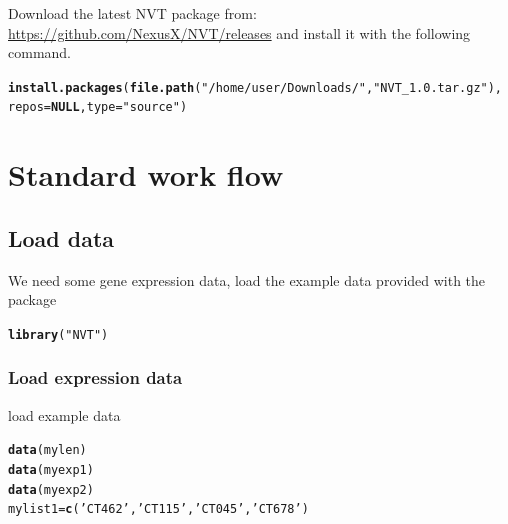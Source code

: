 \documentclass[11pt]{article}\usepackage[]{graphicx}\usepackage[]{color}
\makeatletter
\newcommand{\hlstr}[1]{\textcolor[rgb]{0.192,0.494,0.8}{#1}}%
\newcommand{\hlstd}[1]{\textcolor[rgb]{0.345,0.345,0.345}{#1}}%
\newcommand{\hlkwa}[1]{\textcolor[rgb]{0.161,0.373,0.58}{\textbf{#1}}}%
\newcommand{\hlkwb}[1]{\textcolor[rgb]{0.69,0.353,0.396}{#1}}%
\newcommand{\hlkwc}[1]{\textcolor[rgb]{0.333,0.667,0.333}{#1}}%
\newcommand{\hlkwd}[1]{\textcolor[rgb]{0.737,0.353,0.396}{\textbf{#1}}}%
\newenvironment{kframe}{%
 \def\at@end@of@kframe{}%
 \ifinner\ifhmode%
  \def\at@end@of@kframe{\end{minipage}}%
  \begin{minipage}{\columnwidth}%
 \fi\fi%
 \def\FrameCommand##1{\hskip\@totalleftmargin \hskip-\fboxsep
 \colorbox{shadecolor}{##1}\hskip-\fboxsep
     \hskip-\linewidth \hskip-\@totalleftmargin \hskip\columnwidth}%
 \MakeFramed {\advance\hsize-\width
   \@totalleftmargin\z@ \linewidth\hsize
   \@setminipage}}%
 {\par\unskip\endMakeFramed%
 \at@end@of@kframe}
\newenvironment{knitrout}{}{} %
\makeatother
\begin{document}
Download the latest NVT package from: \url{https://github.com/NexusX/NVT/releases} and install it with the following command.

\begin{knitrout}
\color{fgcolor}\begin{kframe}
\begin{alltt}
\hlkwd{install.packages}\hlstd{(}\hlkwd{file.path}\hlstd{(}\hlstr{"/home/user/Downloads/"}\hlstd{,}\hlstr{"NVT_1.0.tar.gz"}\hlstd{),}
\hlkwc{repos}\hlstd{=}\hlkwa{NULL}\hlstd{,} \hlkwc{type}\hlstd{=}\hlstr{"source"}\hlstd{)}
\end{alltt}
\end{kframe}
\end{knitrout}

\section{Standard work flow}

\subsection{Load data}

We need some gene expression data, load the example data provided with the package

\begin{knitrout}
\color{fgcolor}\begin{kframe}
\begin{alltt}
\hlkwd{library}\hlstd{(}\hlstr{"NVT"}\hlstd{)}
\end{alltt}
\end{kframe}
\end{knitrout}

\subsubsection{Load expression data}

load example data

\begin{knitrout}
\color{fgcolor}\begin{kframe}
\begin{alltt}
\hlkwd{data}\hlstd{(mylen)}
\hlkwd{data}\hlstd{(myexp1)}
\hlkwd{data}\hlstd{(myexp2)}
\hlstd{mylist1}\hlkwb{=}\hlkwd{c}\hlstd{(}\hlstr{'CT462'}\hlstd{,}\hlstr{'CT115'}\hlstd{,}\hlstr{'CT045'}\hlstd{,}\hlstr{'CT678'}\hlstd{)}
\end{alltt}
\end{kframe}
\end{knitrout}
\end{document}
